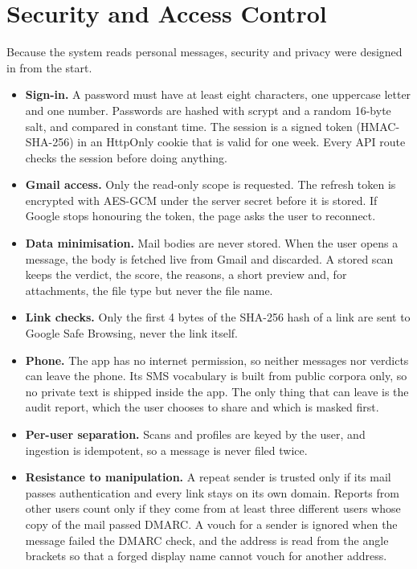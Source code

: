 {\section{Security and Access Control}\label{sec:sec}
Because the system reads personal messages, security and privacy were designed in from the start.
\begin{itemize}
\item \textbf{Sign-in.} A password must have at least eight characters, one uppercase letter and one number. Passwords are hashed with scrypt and a random 16-byte salt, and compared in constant time. The session is a signed token (HMAC-SHA-256) in an HttpOnly cookie that is valid for one week. Every API route checks the session before doing anything.
\item \textbf{Gmail access.} Only the read-only scope is requested. The refresh token is encrypted with AES-GCM under the server secret before it is stored. If Google stops honouring the token, the page asks the user to reconnect.
\item \textbf{Data minimisation.} Mail bodies are never stored. When the user opens a message, the body is fetched live from Gmail and discarded. A stored scan keeps the verdict, the score, the reasons, a short preview and, for attachments, the file type but never the file name.
\item \textbf{Link checks.} Only the first 4 bytes of the SHA-256 hash of a link are sent to Google Safe Browsing, never the link itself.
\item \textbf{Phone.} The app has no internet permission, so neither messages nor verdicts can leave the phone. Its SMS vocabulary is built from public corpora only, so no private text is shipped inside the app. The only thing that can leave is the audit report, which the user chooses to share and which is masked first.
\item \textbf{Per-user separation.} Scans and profiles are keyed by the user, and ingestion is idempotent, so a message is never filed twice.
\item \textbf{Resistance to manipulation.} A repeat sender is trusted only if its mail passes authentication and every link stays on its own domain. Reports from other users count only if they come from at least three different users whose copy of the mail passed DMARC. A vouch for a sender is ignored when the message failed the DMARC check, and the address is read from the angle brackets so that a forged display name cannot vouch for another address.
\end{itemize}

}
